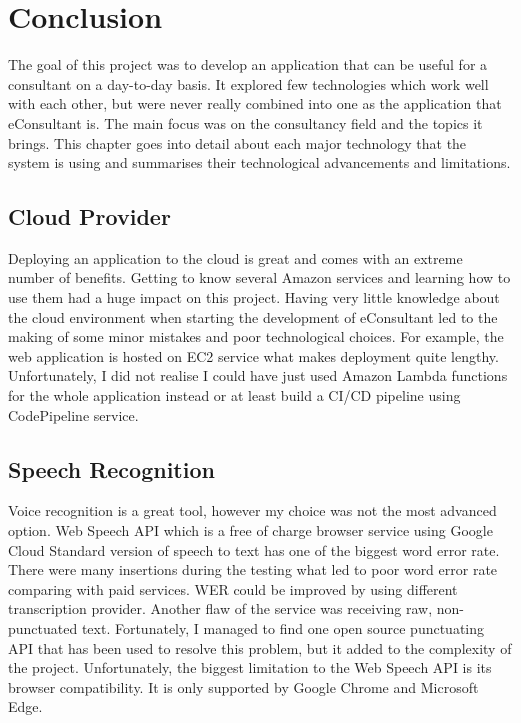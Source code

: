 \documentclass{article}
\begin{document}
\newpage
\section{Conclusion}
{\large 
The goal of this project was to develop an application that can be useful for a consultant on a day-to-day basis. It explored few technologies which work well with each other, but were never really combined into one as the application that eConsultant is. The main focus was on the consultancy field and the topics it brings. This chapter goes into detail about each major technology that the system is using and summarises their technological advancements and limitations.\par
}

\subsection{Cloud Provider}
{\large 
Deploying an application to the cloud is great and comes with an extreme number of benefits. Getting to know several Amazon services and learning how to use them had a huge impact on this project. Having very little knowledge about the cloud environment when starting the development of eConsultant led to the making of some minor mistakes and poor technological choices. For example, the web application is hosted on EC2 service what makes deployment quite lengthy. Unfortunately, I did not realise I could have just used Amazon Lambda functions for the whole application instead or at least build a CI/CD pipeline using CodePipeline service.\par   
}

\subsection{Speech Recognition}
{\large 
Voice recognition is a great tool, however my choice was not the most advanced option. Web Speech API which is a free of charge browser service using Google Cloud Standard version of speech to text has one of the biggest word error rate. There were many insertions during the testing what led to poor word error rate comparing with paid services. WER could be improved by using different transcription provider. Another flaw of the service was receiving raw, non-punctuated text. Fortunately, I managed to find one open source punctuating API that has been used to resolve this problem, but it added to the complexity of the project. Unfortunately, the biggest limitation to the Web Speech API is its browser compatibility. It is only supported by Google Chrome and Microsoft Edge.\par   
}
\end{document}
